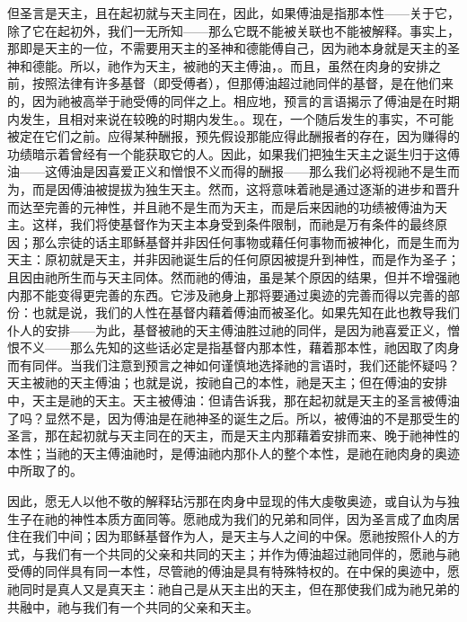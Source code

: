 但圣言是天主，且在起初就与天主同在，因此，如果傅油是指那本性——关于它，除了它在起初外，我们一无所知——那么它既不能被关联也不能被解释。事实上，那即是天主的一位，不需要用天主的圣神和德能傅自己，因为祂本身就是天主的圣神和德能。所以，祂作为天主，被祂的天主傅油，。而且，虽然在肉身的安排之前，按照法律有许多基督（即受傅者），但那傅油超过祂同伴的基督，是在他们来的，因为祂被高举于祂受傅的同伴之上。相应地，预言的言语揭示了傅油是在时期内发生，且相对来说在较晚的时期内发生。。现在，一个随后发生的事实，不可能被定在它们之前。应得某种酬报，预先假设那能应得此酬报者的存在，因为赚得的功绩暗示着曾经有一个能获取它的人。因此，如果我们把独生天主之诞生归于这傅油——这傅油是因喜爱正义和憎恨不义而得的酬报——那么我们必将视祂不是生而为，而是因傅油被提拔为独生天主。然而，这将意味着祂是通过逐渐的进步和晋升而达至完善的元神性，并且祂不是生而为天主，而是后来因祂的功绩被傅油为天主。这样，我们将使基督作为天主本身受到条件限制，而祂是万有条件的最终原因；那么宗徒的话主耶稣基督并非因任何事物或藉任何事物而被神化，而是生而为天主：原初就是天主，并非因祂诞生后的任何原因被提升到神性，而是作为圣子；且因由祂所生而与天主同体。然而祂的傅油，虽是某个原因的结果，但并不增强祂内那不能变得更完善的东西。它涉及祂身上那将要通过奥迹的完善而得以完善的部份：也就是说，我们的人性在基督内藉着傅油而被圣化。如果先知在此也教导我们仆人的安排——为此，基督被祂的天主傅油胜过祂的同伴，是因为祂喜爱正义，憎恨不义——那么先知的这些话必定是指基督内那本性，藉着那本性，祂因取了肉身而有同伴。当我们注意到预言之神如何谨慎地选择祂的言语时，我们还能怀疑吗？天主被祂的天主傅油；也就是说，按祂自己的本性，祂是天主；但在傅油的安排中，天主是祂的天主。天主被傅油：但请告诉我，那在起初就是天主的圣言被傅油了吗？显然不是，因为傅油是在祂神圣的诞生之后。所以，被傅油的不是那受生的圣言，那在起初就与天主同在的天主，而是天主内那藉着安排而来、晚于祂神性的本性；当祂的天主傅油祂时，是傅油祂内那仆人的整个本性，是祂在祂肉身的奥迹中所取了的。\par

因此，愿无人以他不敬的解释玷污那在肉身中显现的伟大虔敬奥迹，或自认为与独生子在祂的神性本质方面同等。愿祂成为我们的兄弟和同伴，因为圣言成了血肉居住在我们中间；因为耶稣基督作为人，是天主与人之间的中保。愿祂按照仆人的方式，与我们有一个共同的父亲和共同的天主；并作为傅油超过祂同伴的，愿祂与祂受傅的同伴具有同一本性，尽管祂的傅油是具有特殊特权的。在中保的奥迹中，愿祂同时是真人又是真天主：祂自己是从天主出的天主，但在那使我们成为祂兄弟的共融中，祂与我们有一个共同的父亲和天主。\par

